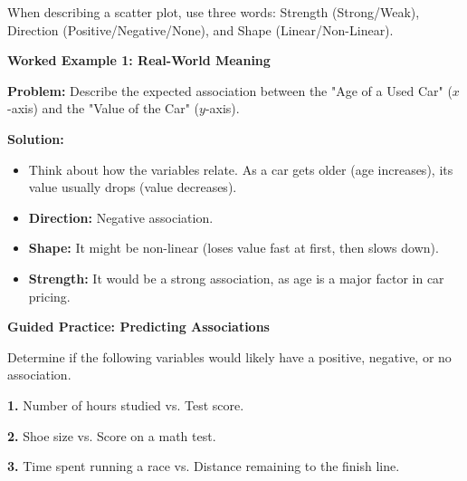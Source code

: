\documentclass[12pt, letterpaper, fleqn]{article}
\newcommand{\blanklong}{\underline{\hspace{6.5cm}}}
\begin{document}
\noindent
When describing a scatter plot, use three words: Strength (Strong/Weak), Direction (Positive/Negative/None), and Shape (Linear/Non-Linear).

\vspace{3mm}

\begin{tcolorbox}[colback=white, colframe=black!25, boxrule=0.6pt, arc=4mm, left=6mm, right=6mm, top=5mm, bottom=5mm]

\textbf{Worked Example 1: Real-World Meaning}

\medskip

\textbf{Problem:} Describe the expected association between the "Age of a Used Car" ($x$-axis) and the "Value of the Car" ($y$-axis).

\medskip

\textbf{Solution:}
\begin{itemize}
    \item Think about how the variables relate. As a car gets older (age increases), its value usually drops (value decreases).
    \item \textbf{Direction:} Negative association.
    \item \textbf{Shape:} It might be non-linear (loses value fast at first, then slows down).
    \item \textbf{Strength:} It would be a strong association, as age is a major factor in car pricing.
\end{itemize}

\end{tcolorbox}

\vspace{4mm}

\begin{tcolorbox}[colback=white!15, colframe=black, boxrule=1.5pt, arc=4mm, left=6mm, right=6mm, top=5mm, bottom=5mm]

\textbf{Guided Practice: Predicting Associations}

\medskip

\noindent
Determine if the following variables would likely have a positive, negative, or no association.
\vspace{2mm}

\noindent
\textbf{1.} Number of hours studied vs. Test score. \blanklong
\vspace{1.5cm}

\noindent
\textbf{2.} Shoe size vs. Score on a math test. \blanklong
\vspace{1.5cm}

\noindent
\textbf{3.} Time spent running a race vs. Distance remaining to the finish line. \blanklong
\vspace{1.5cm}

\end{tcolorbox}
\end{document}
